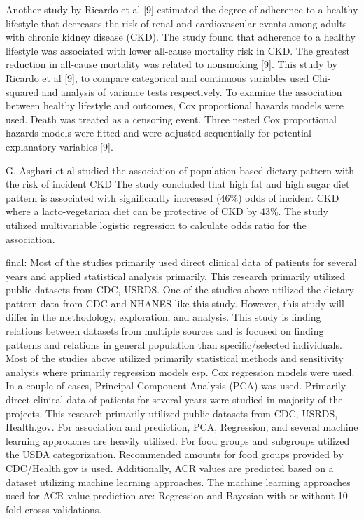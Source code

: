 \medskip
\noindent Another study by Ricardo et al [9] estimated the degree of adherence to a healthy lifestyle that decreases the risk of renal and cardiovascular events among adults with chronic kidney disease (CKD). The study found that adherence to a healthy lifestyle was associated with lower all-cause mortality risk in CKD. The greatest reduction in all-cause mortality was related to nonsmoking [9]. This study by Ricardo et al [9], to compare categorical and continuous variables used Chi-squared and analysis of variance tests respectively. To examine the association between healthy lifestyle and outcomes, Cox proportional hazards models were used. Death was treated as a censoring event. Three nested Cox proportional hazards models were fitted and were adjusted sequentially for potential explanatory variables [9].

\medskip
\noindent G. Asghari et al studied the association of population-based dietary pattern with the risk of incident CKD The study concluded that high fat and high sugar diet pattern is associated with significantly increased (46\%) odds of incident CKD where a lacto-vegetarian diet can be protective of CKD by 43\%. The study utilized multivariable logistic regression to calculate odds ratio for the association.

\medskip
\noindent  final:  Most of the studies primarily used direct clinical data of patients for several years and applied statistical analysis primarily. This research primarily utilized public datasets from CDC, USRDS.  One of the studies above utilized the dietary pattern data from CDC and NHANES like this study. However, this study will differ in the methodology, exploration, and analysis. This study is finding relations between datasets from multiple sources and is focused on finding patterns and relations in general population than specific/selected individuals. Most of the studies above utilized primarily statistical methods and sensitivity analysis where primarily regression models esp. Cox regression models were used. In a couple of cases, Principal Component Analysis (PCA) was used. Primarily direct clinical data of patients for several years were studied in majority of the projects. This research primarily utilized public datasets from CDC, USRDS, Health.gov. For association and prediction, PCA, Regression, and several machine learning approaches are heavily utilized. For food groups and subgroups  utilized the USDA categorization. Recommended amounts for food groups provided by CDC/Health.gov is used. Additionally, ACR values are predicted based on a dataset utilizing machine learning approaches.  The machine learning approaches used for ACR value prediction are: Regression and Bayesian with or without 10 fold crosss validations.